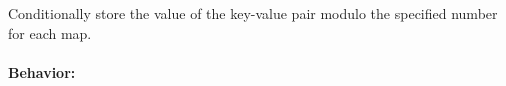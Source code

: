 Conditionally store the value of the key-value pair modulo the specified number
for each map.

\paragraph{Behavior:}
\begin{itemize}[noitemsep]



\end{itemize}
